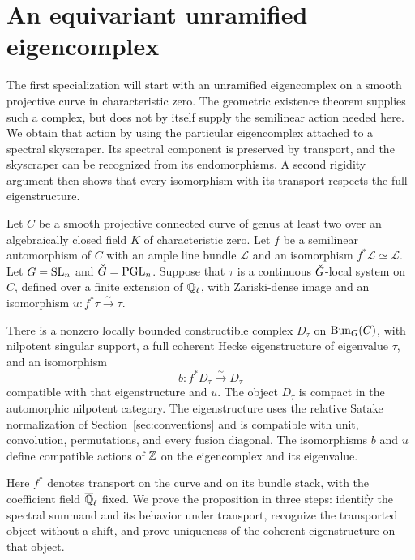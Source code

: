 \section{An equivariant unramified eigencomplex}\label{sec:unramified}

The first specialization will start with an unramified eigencomplex on a
smooth projective curve in characteristic zero.  The geometric existence
theorem supplies such a complex, but does not by itself supply the
semilinear action needed here.  We obtain that action by using the
particular eigencomplex attached to a spectral skyscraper.  Its spectral
component is preserved by transport, and the skyscraper can be recognized
from its endomorphisms.  A second rigidity argument then shows that every
isomorphism with its transport respects the full eigenstructure.

\begin{proposition}\label{prop:equivariant-unramified}
Let $C$ be a smooth projective connected curve of genus at least two over
an algebraically closed field $K$ of characteristic zero.  Let $f$ be a
semilinear automorphism of $C$ with an ample line bundle $\mathcal L$
and an isomorphism $f^*\mathcal L\simeq\mathcal L$.  Let $G=\mathrm{SL}_n$
and $\check G=\mathrm{PGL}_n$.  Suppose that $\tau$ is a continuous $\check G$-local system
on $C$, defined over a finite extension of $\mathbb Q_\ell$, with Zariski-dense
image and an isomorphism $u:f^*\tau\xrightarrow{\sim}\tau$.

There is a nonzero locally bounded constructible complex $D_\tau$ on
$\operatorname{Bun}_G(C)$, with nilpotent singular support, a full coherent Hecke
eigenstructure of eigenvalue $\tau$, and an isomorphism
\[
                 b:f^*D_\tau\xrightarrow{\sim}D_\tau
\]
compatible with that eigenstructure and $u$.  The object $D_\tau$ is compact
in the automorphic nilpotent category.  The eigenstructure uses the
relative Satake normalization of Section~\ref{sec:conventions} and is
compatible with unit, convolution, permutations, and every fusion
diagonal.  The isomorphisms $b$ and $u$ define compatible actions of
$\mathbb Z$ on the eigencomplex and its eigenvalue.
\end{proposition}

Here $f^*$ denotes transport on the curve and on its bundle stack, with
the coefficient field $\overline{\mathbb Q}_{\ell}$ fixed.  We prove the proposition in three
steps: identify the spectral summand and its behavior under transport,
recognize the transported object without a shift, and prove uniqueness
of the coherent eigenstructure on that object.

